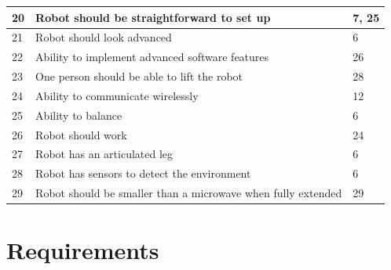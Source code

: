 \documentclass{fank1basedocument}
\begin{document}
\begin{center}
\begin{tabular}{|p{}|p{}|p{}|}
		\hline
		20 & Robot should be straightforward to set up & 7, 25\\
		\hline
		21 & Robot should look advanced & 6\\
		\hline
		22 & Ability to implement advanced software features & 26\\
		\hline
		23 & One person should be able to lift the robot & 28\\
		\hline
		24 & Ability to communicate wirelessly & 12\\
		\hline
		25 & Ability to balance & 6\\
		\hline
		26 & Robot should work & 24\\
		\hline
		27 & Robot has an articulated leg & 6\\
		\hline
		28 & Robot has sensors to detect the environment & 6\\
		\hline
		29 & Robot should be smaller than a microwave when fully extended & 29\\
		\hline
	\end{tabular}
\end{center}

\section*{Requirements}
\end{document}
